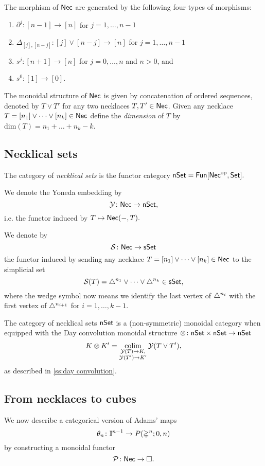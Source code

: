 The morphism of $\mathsf{Nec}$ are generated by the following four types of morphisms:
\begin{enumerate}
	\item $\partial^j \colon [n-1] \to [n]$ for $j = 1, \dots, n-1$
	\item $\Delta_{[j], [n-j]} \colon  [j] \vee [n-j] \to [n]$ for $j = 1, \dots, n-1$
	\item $s^j \colon [n+1] \to [n]$ for $j = 0, \dots, n$ and $n>0$, and 
	\item $s^0 \colon [1] \to [0]$.
\end{enumerate}
The monoidal structure of $\mathsf{Nec}$ is given by concatenation of ordered sequences, denoted by $T \vee T'$ for any two necklaces $T, T' \in \mathsf{Nec}$.
Given any necklace $T = [n_1] \vee \dots \vee[n_k] \in \mathsf{Nec}$ define the \textit{dimension} of $T$ by $\text{dim}(T)=n_1 + \dots + n_k-k$.

\subsection{Necklical sets} The category of \textit{necklical sets} is the functor category $\mathsf{nSet}=\mathsf{Fun}[\mathsf{Nec}^{\mathrm{op}}, \mathsf{Set}].$

We denote the Yoneda embedding by $$\mathcal{Y} \colon \mathsf{Nec} \to \mathsf{nSet},$$ i.e. the functor induced by $T \mapsto \mathsf{Nec}(-,T).$

We denote by $$\mathcal{S} \colon \mathsf{Nec} \to \mathsf{sSet}$$ the functor induced by sending any necklace $T=[n_1] \vee \dots \vee[n_k] \in \mathsf{Nec}$ to the simplicial set $$\mathcal{S}(T)= \triangle^{n_1} \vee\dots \vee \triangle^{n_k} \in \mathsf{sSet},$$ where the wedge symbol now means we identify the last vertex of $\triangle^{n_i}$ with the first vertex of $\triangle^{n_{i+1}}$ for $i=1,\dots,k-1$.

The category of necklical sets $\mathsf{nSet}$ is a (non-symmetric) monoidal category when equipped with the Day convolution monoidal structure $\otimes\colon \mathsf{nSet} \times \mathsf{nSet} \to \mathsf{nSet}$
$$K \otimes K' = \operatorname*{colim}_{\substack{\mathcal{Y}(T) \to K, \\ \mathcal{Y}(T')\to K'}} \mathcal{Y}(T \vee T'),$$ as described in
 \cref{ss:day convolution}.

\subsection{From necklaces to cubes}

We now describe a categorical version of Adams' maps
\begin{equation*}
\theta_n \colon \mathbb{I}^{n-1} \to P(\mathbb{\Delta}^{n};0,n)
\end{equation*}
by constructing a monoidal functor
\begin{equation*}
\mathcal{P} \colon \mathsf{Nec} \to \square.
\end{equation*}

